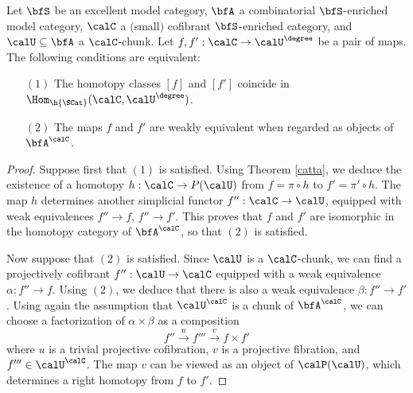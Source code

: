 \begin{lemma}\label{tuff}
Let $\bfS$ be an excellent model category, $\bfA$ a combinatorial $\bfS$-enriched model category,
$\calC$ a $($small$)$ cofibrant $\bfS$-enriched category, and $\calU \subseteq \bfA$ a $\calC$-chunk.
Let $f,f': \calC \rightarrow \calU^{\degree}$ be a pair of maps. The following conditions are equivalent:
\begin{itemize}
\item[$(1)$] The homotopy classes $[f]$ and $[f']$ coincide in 
$\Hom_{ \h{\SCat}}( \calC, \calU^{\degree})$.
\item[$(2)$] The maps $f$ and $f'$ are weakly equivalent when regarded as objects
of $\bfA^{\calC}$.
\end{itemize}
\end{lemma}

\begin{proof}

Suppose first that $(1)$ is satisfied. Using Theorem \ref{catta}, we deduce
the existence of a homotopy $h: \calC \rightarrow P(\calU)$ from
$f = \pi \circ h$ to $f' = \pi' \circ h$. The map $h$
determines another simplicial functor $f'': \calC \rightarrow
\calU$, equipped with weak equivalences $f'' \rightarrow f$, $f''
\rightarrow f'$. This proves that $f$ and $f'$ are isomorphic in the homotopy category
of $\bfA^{\calC}$, so that $(2)$ is satisfied.

Now suppose that $(2)$ is satisfied. Since $\calU$ is a $\calC$-chunk, we can find
a projectively cofibrant $f'': \calU \rightarrow \calC$ equipped with a weak equivalence
$\alpha: f'' \rightarrow f$. Using $(2)$, we deduce that there is also a weak equivalence
$\beta: f'' \rightarrow f'$. Using again the assumption that $\calU^{\calC}$ is a chunk of
$\bfA^{\calC}$, we can choose a factorization of $\alpha \times \beta$ as a composition
$$ f'' \stackrel{u}{\rightarrow} f''' \stackrel{v}{\rightarrow} f \times f'$$ 
where $u$ is a trivial projective cofibration, $v$ is a projective fibration, and
$f''' \in \calU^{\calC}$. The map $v$ can be viewed as an object of $\calP(\calU)$, which
determines a right homotopy from $f$ to $f'$. 
\end{proof}

